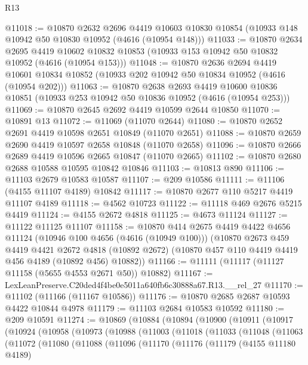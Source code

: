 \begin{lexlean}{R13}
\begin{coremodule}
@11018 := @10870
    @2632
    @2696
    @4419
    @10603
    @10830
    @10854
    (@10933 @148 @10942 @50 @10830 @10952 (@4616 (@10954 @148)))
@11033 := @10870
    @2634
    @2695
    @4419
    @10602
    @10832
    @10853
    (@10933 @153 @10942 @50 @10832 @10952 (@4616 (@10954 @153)))
@11048 := @10870
    @2636
    @2694
    @4419
    @10601
    @10834
    @10852
    (@10933 @202 @10942 @50 @10834 @10952 (@4616 (@10954 @202)))
@11063 := @10870
    @2638
    @2693
    @4419
    @10600
    @10836
    @10851
    (@10933 @253 @10942 @50 @10836 @10952 (@4616 (@10954 @253)))
@11069 := @10870 @2645 @2692 @4419 @10599 @2644 @10850
@11070 := @10891 @13
@11072 := @11069 (@11070 @2644)
@11080 := @10870 @2652 @2691 @4419 @10598 @2651 @10849 (@11070 @2651)
@11088 := @10870 @2659 @2690 @4419 @10597 @2658 @10848 (@11070 @2658)
@11096 := @10870 @2666 @2689 @4419 @10596 @2665 @10847 (@11070 @2665)
@11102 := @10870 @2680 @2688 @10588 @10595 @10842 @10846
@11103 := @10813 @890
@11106 := @11103 @2679 @10583 @10587
@11107 := @209 @10586
@11111 := @11106 (@4155 @11107 @4189) @10842
@11117 := @10870 @2677 @110 @5217 @4419 @11107 @4189
@11118 := @4562 @10723
@11122 := @11118 @469 @2676 @5215 @4419
@11124 := @4155 @2672 @4818
@11125 := @4673 @11124
@11127 := @11122 @11125 @11107
@11158 := @10870
    @414
    @2675
    @4419
    @4422
    @4656
    @11124
    (@10946 @100 @4656 (@4616 (@10949 @100)))
    (@10870
      @2673
      @459
      @4419
      @4421
      @2672
      @4818
      (@10892 @2672)
      (@10870 @457 @110 @4419 @4419 @456 @4189 (@10892 @456) @10882))
@11166 := @11111 (@11117 (@11127 @11158 (@5655 @4553 @2671 @50)) @10882)
@11167 := LexLeanPreserve.C20ded4f4be0e5011a640fb6c30888a67.R13.__rel_27
@11170 := @11102 (@11166 (@11167 @10586))
@11176 := @10870 @2685 @2687 @10593 @4422 @10844 @4978
@11179 := @11103 @2684 @10583 @10592
@11180 := @209 @10591
@11274 := @10869
    (@10884
      (@10894
        (@10900
          (@10911
            (@10917
              (@10924
                (@10958
                  (@10973
                    (@10988
                      (@11003
                        (@11018
                          (@11033
                            (@11048
                              (@11063
                                (@11072
                                  (@11080
                                    (@11088
                                      (@11096
                                        (@11170
                                          (@11176
                                            (@11179
                                              (@4155 @11180 @4189)

\end{coremodule}
\end{lexlean}
